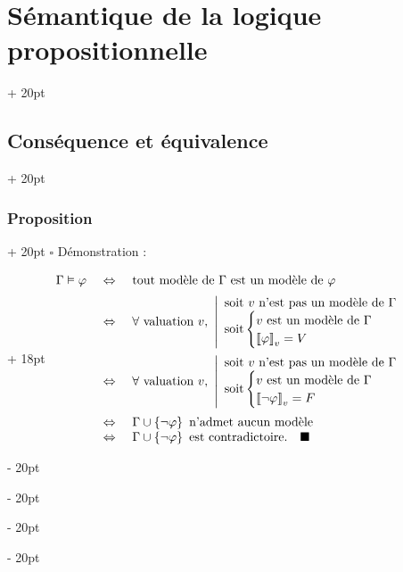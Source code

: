 \documentclass[a4paper, 12pt, twoside]{article}
\newcommand{\lrbb}[1]{\left\llbracket #1 \right\rrbracket}
\newcommand{\set}[1]{\left\{ #1 \right\}}
\newcommand{\ssi}{\ \Leftrightarrow \ }
\newcommand{\ind}[1][20pt]{\advance\leftskip + #1}
\newcommand{\deind}[1][20pt]{\advance\leftskip - #1}
\newenvironment{indt}[2][20pt]{#2 \par \ind[#1]}{\par \deind} %
\begin{document}
\begin{indt}{\section{Sémantique de la logique propositionnelle}}
\begin{indt}{\subsection{Conséquence et équivalence}}
\begin{indt}{\subsubsection{Proposition}}
                \begin{indt}[18pt]{$\square$ Démonstration :}
                    $
                        \begin{array}{rcl}
                            \Gamma \vDash \varphi &\ssi& \text{tout modèle de $\Gamma$ est un modèle de $\varphi$}
                            \vspace{6pt}
                            \\
                            &\ssi& \forall\ \text{valuation}\ v,\
                            \left|
                            \begin{array}{l}
                                \text{soit $v$ n'est pas un modèle de $\Gamma$}
                                \\
                                \text{soit}
                                \begin{cases}
                                    v\ \text{est un modèle de $\Gamma$}
                                    \\
                                    \lrbb \varphi _v = V
                                \end{cases}
                            \end{array}
                            \right.
                            \vspace{6pt}
                            \\
                            &\ssi& \forall\ \text{valuation $v$},\
                            \left|
                            \begin{array}{l}
                                \text{soit $v$ n'est pas un modèle de $\Gamma$}
                                \\
                                \text{soit}
                                \begin{cases}
                                    v\ \text{est un modèle de $\Gamma$}
                                    \\
                                    \lrbb{\neg \varphi}_v = F
                                \end{cases}
                            \end{array}
                            \right.
                            \vspace{6pt}
                            \\
                            &\ssi& \Gamma \cup \set{\neg \varphi}\ \text{n'admet aucun modèle}
                            \\
                            &\ssi& \Gamma \cup \set{\neg \varphi}\ \text{est contradictoire.} \quad \blacksquare
                        \end{array}
                    $
                \end{indt}
            \end{indt}
            

\end{indt}
\end{indt}
\end{document}
